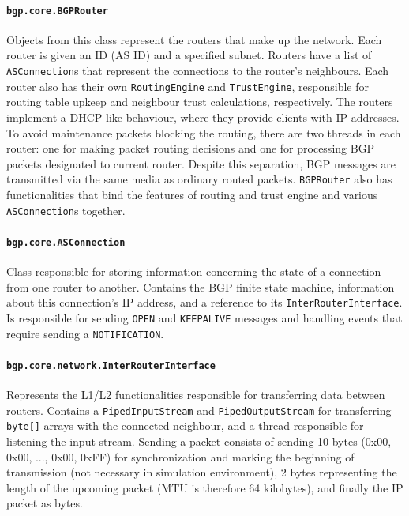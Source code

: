\documentclass[11pt,a4paper,titlepage]{report}
\begin{document}
\paragraph{\texttt{bgp.core.BGPRouter}}
Objects from this class represent the routers that make up the network. Each router is given an ID (AS ID) and a specified subnet. Routers have a list of \texttt{ASConnection}s that represent the connections to the router's neighbours. Each router also has their own \texttt{RoutingEngine} and \texttt{TrustEngine}, responsible for routing table upkeep and neighbour trust calculations, respectively. The routers implement a DHCP-like behaviour, where they provide clients with IP addresses. To avoid maintenance packets blocking the routing, there are two threads in each router: one for making packet routing decisions and one for processing BGP packets designated to current router. Despite this separation, BGP messages are transmitted via the same media as ordinary routed packets. \texttt{BGPRouter} also has functionalities that bind the features of routing and trust engine and various \texttt{ASConnection}s together.

\paragraph{\texttt{bgp.core.ASConnection}}
Class responsible for storing information concerning the state of a connection from one router to another. Contains the BGP finite state machine, information about this connection's IP address, and a reference to its \texttt{InterRouterInterface}. Is responsible for sending \texttt{OPEN} and \texttt{KEEPALIVE} messages and handling events that require sending a \texttt{NOTIFICATION}.

\paragraph{\texttt{bgp.core.network.InterRouterInterface}}
Represents the L1/L2 functionalities responsible for transferring data between routers. Contains a \texttt{PipedInputStream} and \texttt{PipedOutputStream} for transferring \texttt{byte[]} arrays with the connected neighbour, and a thread responsible for listening the input stream. Sending a packet consists of sending 10 bytes (0x00, 0x00, ..., 0x00, 0xFF) for synchronization and marking the beginning of transmission (not necessary in simulation environment), 2 bytes representing the length of the upcoming packet (MTU is therefore 64 kilobytes), and finally the IP packet as bytes.
\end{document}
